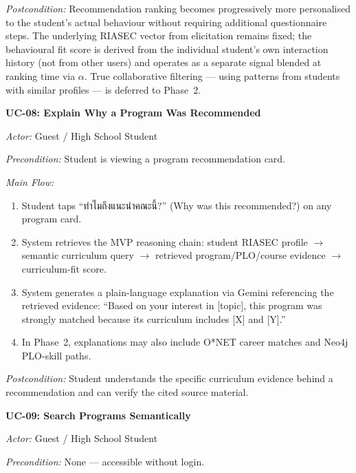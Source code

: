 \noindent\textit{Postcondition:} Recommendation ranking becomes progressively more personalised to the student's actual behaviour without requiring additional questionnaire steps. The underlying RIASEC vector from elicitation remains fixed; the behavioural fit score is derived from the individual student's own interaction history (not from other users) and operates as a separate signal blended at ranking time via $\alpha$. True collaborative filtering --- using patterns from students with similar profiles --- is deferred to Phase~2.

\vspace{1ex}
\noindent\textbf{UC-08: Explain Why a Program Was Recommended}

\noindent\textit{Actor:} Guest / High School Student

\noindent\textit{Precondition:} Student is viewing a program recommendation card.

\noindent\textit{Main Flow:}
\begin{enumerate}[leftmargin=80pt]
    \item Student taps ``ทำไมถึงแนะนำคณะนี้?'' (Why was this recommended?) on any program card.
    \item System retrieves the MVP reasoning chain: student RIASEC profile $\rightarrow$ semantic curriculum query $\rightarrow$ retrieved program/PLO/course evidence $\rightarrow$ curriculum-fit score.
    \item System generates a plain-language explanation via Gemini referencing the retrieved evidence: ``Based on your interest in [topic], this program was strongly matched because its curriculum includes [X] and [Y].''
    \item In Phase~2, explanations may also include O*NET career matches and Neo4j PLO-skill paths.
\end{enumerate}

\noindent\textit{Postcondition:} Student understands the specific curriculum evidence behind a recommendation and can verify the cited source material.

\vspace{1ex}
\noindent\textbf{UC-09: Search Programs Semantically}

\noindent\textit{Actor:} Guest / High School Student

\noindent\textit{Precondition:} None --- accessible without login.

